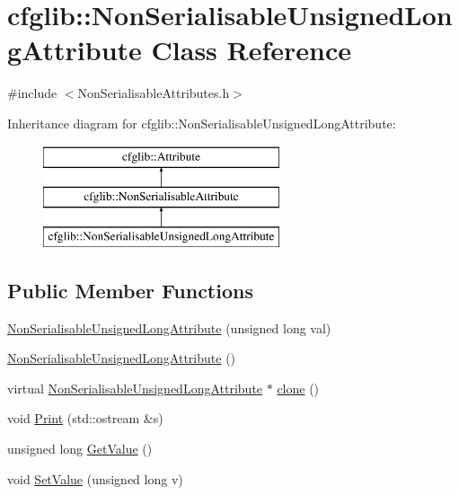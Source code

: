 \hypertarget{classcfglib_1_1NonSerialisableUnsignedLongAttribute}{}\section{cfglib\+:\+:Non\+Serialisable\+Unsigned\+Long\+Attribute Class Reference}
\label{classcfglib_1_1NonSerialisableUnsignedLongAttribute}


{\ttfamily \#include $<$Non\+Serialisable\+Attributes.\+h$>$}

Inheritance diagram for cfglib\+:\+:Non\+Serialisable\+Unsigned\+Long\+Attribute\+:\begin{figure}[H]
\begin{center}
\leavevmode
\includegraphics[height=3.000000cm]{classcfglib_1_1NonSerialisableUnsignedLongAttribute}
\end{center}
\end{figure}
\subsection*{Public Member Functions}
\begin{DoxyCompactItemize}
\item 
\hyperlink{classcfglib_1_1NonSerialisableUnsignedLongAttribute_a898beaee191d410f062ff7b839a51039}{Non\+Serialisable\+Unsigned\+Long\+Attribute} (unsigned long val)
\item 
\hyperlink{classcfglib_1_1NonSerialisableUnsignedLongAttribute_ae083d3614a66047ab325a009a7db88a5}{Non\+Serialisable\+Unsigned\+Long\+Attribute} ()
\item 
virtual \hyperlink{classcfglib_1_1NonSerialisableUnsignedLongAttribute}{Non\+Serialisable\+Unsigned\+Long\+Attribute} $\ast$ \hyperlink{classcfglib_1_1NonSerialisableUnsignedLongAttribute_a3c01da3fbc7e617c7a919716a1142f57}{clone} ()
\item 
void \hyperlink{classcfglib_1_1NonSerialisableUnsignedLongAttribute_aef0e4a5bc60b6d4f278ab2daa553f598}{Print} (std\+::ostream \&s)
\item 
unsigned long \hyperlink{classcfglib_1_1NonSerialisableUnsignedLongAttribute_aedeced928ce8d3de8b0a691371b6aded}{Get\+Value} ()
\item 
void \hyperlink{classcfglib_1_1NonSerialisableUnsignedLongAttribute_aea6d8fd0b4f145dc69d54f21d95f09cc}{Set\+Value} (unsigned long v)
\end{DoxyCompactItemize}
